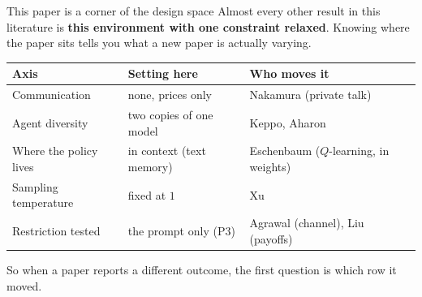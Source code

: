 \documentclass[aspectratio=169,9pt]{beamer}
\newcommand{\orange}[1]{\textcolor{AmazonOrange}{\textbf{#1}}}
\newcommand{\muted}[1]{\textcolor{EPICMuted}{#1}}
\begin{document}
\begin{frame}{This paper is a corner of the design space}
Almost every other result in this literature is \orange{this environment with one constraint relaxed}. Knowing
where the paper sits tells you what a new paper is actually varying.
\vspace{0.15cm}
\begin{center}
\small
\begin{tabular}{@{}p{}p{}p{}@{}}
\toprule
\textbf{Axis} & \textbf{Setting here} & \textbf{Who moves it} \\
\midrule
Communication & none, prices only & Nakamura (private talk) \\[0.2cm]
Agent diversity & two copies of one model & Keppo, Aharon \\[0.2cm]
Where the policy lives & in context (text memory) & Eschenbaum ($Q$-learning, in weights) \\[0.2cm]
Sampling temperature & fixed at $1$ & Xu \\[0.2cm]
Restriction tested & the prompt only (P3) & Agrawal (channel), Liu (payoffs) \\
\bottomrule
\end{tabular}
\end{center}
\vspace{0.1cm}
\muted{So when a paper reports a different outcome, the first question is which row it moved.}
\end{frame}
\end{document}
